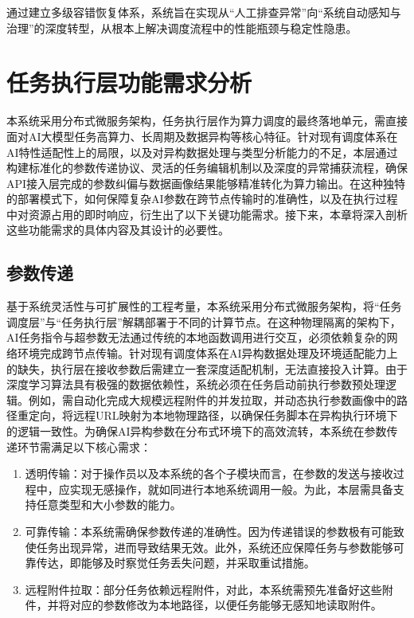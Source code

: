 通过建立多级容错恢复体系，系统旨在实现从“人工排查异常”向“系统自动感知与治理”的深度转型，从根本上解决调度流程中的性能瓶颈与稳定性隐患。

\section{任务执行层功能需求分析}

本系统采用分布式微服务架构，任务执行层作为算力调度的最终落地单元，需直接面对AI大模型任务高算力、长周期及数据异构等核心特征。针对现有调度体系在AI特性适配性上的局限，以及对异构数据处理与类型分析能力的不足，本层通过构建标准化的参数传递协议、灵活的任务编辑机制以及深度的异常捕获流程，确保API接入层完成的参数纠偏与数据画像结果能够精准转化为算力输出。在这种独特的部署模式下，如何保障复杂AI参数在跨节点传输时的准确性，以及在执行过程中对资源占用的即时响应，衍生出了以下关键功能需求。接下来，本章将深入剖析这些功能需求的具体内容及其设计的必要性。

\subsection{参数传递}

基于系统灵活性与可扩展性的工程考量，本系统采用分布式微服务架构，将“任务调度层”与“任务执行层”解耦部署于不同的计算节点。在这种物理隔离的架构下，AI任务指令与超参数无法通过传统的本地函数调用进行交互，必须依赖复杂的网络环境完成跨节点传输。针对现有调度体系在AI异构数据处理及环境适配能力上的缺失，执行层在接收参数后需建立一套深度适配机制，无法直接投入计算。由于深度学习算法具有极强的数据依赖性，系统必须在任务启动前执行参数预处理逻辑。例如，需自动化完成大规模远程附件的并发拉取，并动态执行参数画像中的路径重定向，将远程URL映射为本地物理路径，以确保任务脚本在异构执行环境下的逻辑一致性。为确保AI异构参数在分布式环境下的高效流转，本系统在参数传递环节需满足以下核心需求：

\begin{enumerate}
	\item 透明传输：对于操作员以及本系统的各个子模块而言，在参数的发送与接收过程中，应实现无感操作，就如同进行本地系统调用一般。为此，本层需具备支持任意类型和大小参数的能力。
	\item 可靠传输：本系统需确保参数传递的准确性。因为传递错误的参数极有可能致使任务出现异常，进而导致结果无效。此外，系统还应保障任务与参数能够可靠传达，即能够及时察觉任务丢失问题，并采取重试措施。
	\item 远程附件拉取：部分任务依赖远程附件，对此，本系统需预先准备好这些附件，并将对应的参数修改为本地路径，以便任务能够无感知地读取附件。
\end{enumerate}

